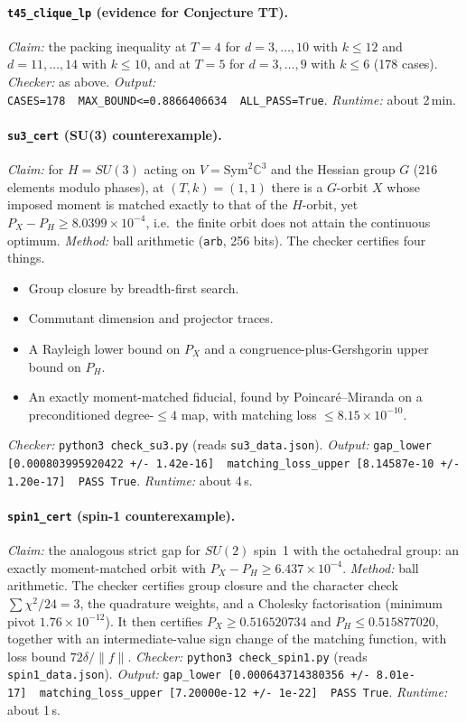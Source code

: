 \documentclass[11pt]{article}
\theoremstyle{definition}
\theoremstyle{remark}
\begin{document}
\paragraph{\texttt{t45\_clique\_lp} (evidence for Conjecture TT).}
\emph{Claim:} the packing inequality at $T=4$ for $d=3,\dots,10$ with $k\le12$ and $d=11,\dots,14$ with $k\le10$, and at $T=5$ for $d=3,\dots,9$ with $k\le6$ (178 cases).
\emph{Checker:} as above.
\emph{Output:} \texttt{CASES=178~~MAX\_BOUND<=0.8866406634~~ALL\_PASS=True}.
\emph{Runtime:} about 2\,min.

\paragraph{\texttt{su3\_cert} (SU(3) counterexample).}
\emph{Claim:} for $H=SU(3)$ acting on $V=\mathrm{Sym}^2\mathbb{C}^3$ and the Hessian group $G$ (216 elements modulo phases), at $(T,k)=(1,1)$ there is a $G$-orbit $X$ whose imposed moment is matched exactly to that of the $H$-orbit, yet $P_X-P_H\ge8.0399\times10^{-4}$, i.e.\ the finite orbit does not attain the continuous optimum.
\emph{Method:} ball arithmetic (\texttt{arb}, 256 bits). The checker certifies four things.
\begin{itemize}
\item Group closure by breadth-first search.
\item Commutant dimension and projector traces.
\item A Rayleigh lower bound on $P_X$ and a congruence-plus-Gershgorin upper bound on $P_H$.
\item An exactly moment-matched fiducial, found by Poincar\'e--Miranda on a preconditioned degree-$\le4$ map, with matching loss $\le8.15\times10^{-10}$.
\end{itemize}
\emph{Checker:} \texttt{python3 check\_su3.py} (reads \texttt{su3\_data.json}).
\emph{Output:} \texttt{gap\_lower [0.000803995920422 +/- 1.42e-16]~\textbar{}~matching\_loss\_upper [8.14587e-10 +/- 1.20e-17]~\textbar{}~PASS True}.
\emph{Runtime:} about 4\,s.

\paragraph{\texttt{spin1\_cert} (spin-1 counterexample).}
\emph{Claim:} the analogous strict gap for $SU(2)$ spin~1 with the octahedral group: an exactly moment-matched orbit with $P_X-P_H\ge6.437\times10^{-4}$.
\emph{Method:} ball arithmetic. The checker certifies group closure and the character check $\sum\chi^2/24=3$, the quadrature weights, and a Cholesky factorisation (minimum pivot $1.76\times10^{-12}$). It then certifies $P_X\ge0.516520734$ and $P_H\le0.515877020$, together with an intermediate-value sign change of the matching function, with loss bound $72\delta/\lVert f\rVert$.
\emph{Checker:} \texttt{python3 check\_spin1.py} (reads \texttt{spin1\_data.json}).
\emph{Output:} \texttt{gap\_lower [0.000643714380356 +/- 8.01e-17]~\textbar{}~matching\_loss\_upper [7.20000e-12 +/- 1e-22]~\textbar{}~PASS True}.
\emph{Runtime:} about 1\,s.
\end{document}
